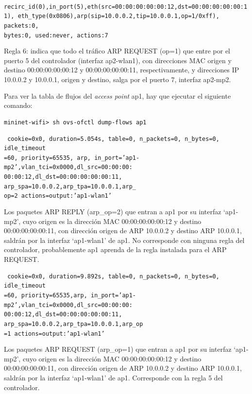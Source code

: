 \documentclass[a4paper,12pt,twoside,spanish]{book}
\begin{document}
\noindent\texttt{
	recirc\_id(0),in\_port(5),eth(src=00:00:00:00:00:12,dst=00:00:00:00:00:11),
	eth\_type(0x0806),arp(sip=10.0.0.2,tip=10.0.0.1,op=1/0xff), packets:0, \\
	bytes:0, used:never, actions:7
}

Regla 6: indica que todo el tráfico ARP REQUEST (op=1) que entre por el puerto 5 del controlador (interfaz ap2-wlan1), con direcciones MAC origen y destino 00:00:00:00:00:12 y 00:00:00:00:00:11, respectivamente, y direcciones IP 10.0.0.2 y 10.0.0.1, origen y destino, salga por el puerto 7, interfaz ap2-mp2.\par 

\hspace{1cm}

Para ver la tabla de flujos del \textit{access point} ap1, hay que ejecutar el siguiente comando:\par 

\begin{center}
	\texttt{mininet-wifi> sh ovs-ofctl dump-flows ap1}
\end{center}

\noindent\texttt{
	cookie=0x0, duration=5.054s, table=0, n\_packets=0, n\_bytes=0, idle\_timeout\\
	=60, priority=65535, arp,
	in\_port='ap1-mp2',vlan\_tci=0x0000,dl\_src=00:00:00:\\
	00:00:12,dl\_dst=00:00:00:00:00:11,
	arp\_spa=10.0.0.2,arp\_tpa=10.0.0.1,arp\_\\
	op=2 actions=output:'ap1-wlan1'
}
 
Los paquetes ARP REPLY (arp\_op=2) que entran a ap1 por su interfaz ‘ap1-mp2’, cuyo origen es la dirección MAC 00:00:00:00:00:12 y destino 00:00:00:00:00:11, con dirección origen de ARP 10.0.0.2 y destino ARP 10.0.0.1, saldrán por la interfaz ‘ap1-wlan1’ de ap1. No corresponde con ninguna regla del controlador, probablemente ap1 aprenda de la regla instalada para el ARP REQUEST.\par 

\noindent\texttt{
	cookie=0x0, duration=9.892s, table=0, n\_packets=0, n\_bytes=0, idle\_timeout\\
	=60, priority=65535,arp,
	in\_port='ap1-mp2',vlan\_tci=0x0000,dl\_src=00:00:00:\\
	00:00:12,dl\_dst=00:00:00:00:00:11,
	arp\_spa=10.0.0.2,arp\_tpa=10.0.0.1,arp\_op\\
	=1 actions=output:'ap1-wlan1'
} 

Los paquetes ARP REQUEST (arp\_op=1) que entran a ap1 por su interfaz ‘ap1-mp2’, cuyo origen es la dirección MAC 00:00:00:00:00:12 y destino 00:00:00:00:00:11, con dirección origen de ARP 10.0.0.2 y destino ARP 10.0.0.1, saldrán por la interfaz ‘ap1-wlan1’ de ap1. Corresponde con la regla 5 del controlador.\par 
\end{document}
